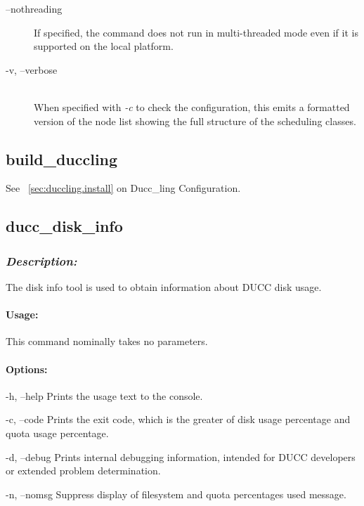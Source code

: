 \begin{description}
            \item[--nothreading] If specified, the command does not run in multi-threaded mode
              even if it is supported on the local platform.

            \item[-v, --verbose] \hfill \\
              When specified with {\em -c} to check the configuration, this emits a formatted version
              of the node list showing the full structure of the scheduling classes.
              

           \end{description}               


            
\subsection{build\_duccling}
\label{subsec:admin.build-duccling}

    See ~\ref{sec:duccling.install} on Ducc\_ling Configuration.


\subsection{ducc\_disk\_info}
\label{subsec:admin.ducc-disk-info}
    \subsubsection{{\em Description:}}

    The disk info tool is used to obtain information about DUCC disk usage. 
    
    \paragraph{Usage:}
        This command nominally takes no parameters.
        
    \paragraph{Options:}
    \begin{description}
      	\item -h, --help      Prints the usage text to the console. 
      	\item -c, --code      Prints the exit code, which is the greater of disk usage percentage and quota usage percentage. 
      	\item -d, --debug     Prints internal debugging information, intended for DUCC developers or extended problem determination.
      	\item -n, --nomsg     Suppress display of filesystem and quota percentages used message. 
    \end{description}       


